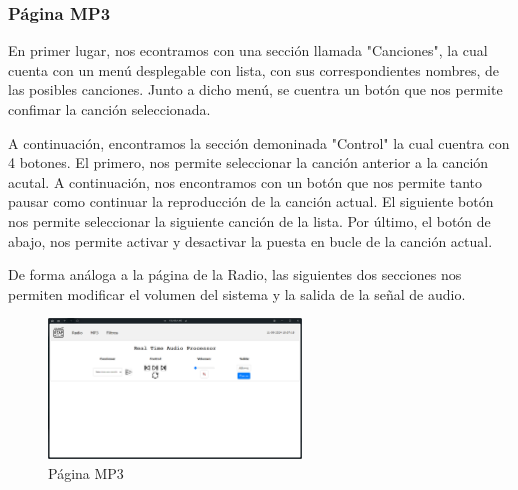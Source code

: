 \subsubsection{Página MP3}
En primer lugar, nos econtramos con una sección llamada "Canciones", la cual cuenta con un menú desplegable con lista, con sus correspondientes nombres, de las posibles canciones. Junto a dicho menú, se cuentra un botón que nos permite confimar la canción seleccionada.

A continuación, encontramos la sección demoninada "Control" la cual cuentra con 4 botones. El primero, nos permite seleccionar la canción anterior a la canción acutal. A continuación, nos encontramos con un botón que nos permite tanto pausar como continuar la reproducción de la canción actual. El siguiente botón nos permite seleccionar la siguiente canción de la lista. Por último, el botón de abajo, nos permite activar y desactivar la puesta en bucle de la canción actual.

De forma análoga a la página de la Radio, las siguientes dos secciones nos permiten modificar el volumen del sistema y la salida de la señal de audio.

\begin{figure}[h]
    \centering
    \includegraphics[width=0.6\textwidth]{images/3/3-1/3-1-1-3/Pagina_MP3.png}
    \caption{Página MP3}
    \label{fig:3-1-1-3-MP3}
\end{figure}